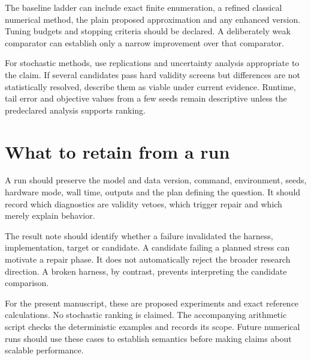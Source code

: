The baseline ladder can include exact finite enumeration, a refined classical numerical method, the plain proposed approximation and any enhanced version. Tuning budgets and stopping criteria should be declared. A deliberately weak comparator can establish only a narrow improvement over that comparator.

For stochastic methods, use replications and uncertainty analysis appropriate to the claim. If several candidates pass hard validity screens but differences are not statistically resolved, describe them as viable under current evidence. Runtime, tail error and objective values from a few seeds remain descriptive unless the predeclared analysis supports ranking.

\section{What to retain from a run}
A run should preserve the model and data version, command, environment, seeds, hardware mode, wall time, outputs and the plan defining the question. It should record which diagnostics are validity vetoes, which trigger repair and which merely explain behavior.

The result note should identify whether a failure invalidated the harness, implementation, target or candidate. A candidate failing a planned stress can motivate a repair phase. It does not automatically reject the broader research direction. A broken harness, by contrast, prevents interpreting the candidate comparison.

For the present manuscript, these are proposed experiments and exact reference calculations. No stochastic ranking is claimed. The accompanying arithmetic script checks the deterministic examples and records its scope. Future numerical runs should use these cases to establish semantics before making claims about scalable performance.
